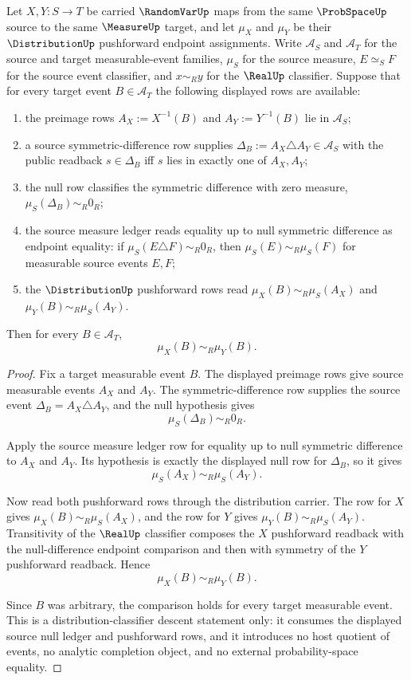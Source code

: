 \begin{theorem}
\label{thm:distribution-null-completion-random-variable-descent}
Let $X,Y:S\to T$ be carried $\RandomVarUp$ maps from the same
$\ProbSpaceUp$ source to the same $\MeasureUp$ target, and let $\mu_X$ and
$\mu_Y$ be their $\DistributionUp$ pushforward endpoint assignments. Write
$\mathcal A_S$ and $\mathcal A_T$ for the source and target measurable-event
families, $\mu_S$ for the source measure, $E\simeq_S F$ for the source event
classifier, and $x\sim_Ry$ for the $\RealUp$ classifier. Suppose that for
every target event $B\in\mathcal A_T$ the following displayed rows are
available:
\begin{enumerate}
\item the preimage rows $A_X:=X^{-1}(B)$ and $A_Y:=Y^{-1}(B)$ lie in
  $\mathcal A_S$;
\item a source symmetric-difference row supplies
  $\Delta_B:=A_X\triangle A_Y\in\mathcal A_S$ with the public readback
  $s\in\Delta_B$ iff $s$ lies in exactly one of $A_X,A_Y$;
\item the null row classifies the symmetric difference with zero measure,
  $\mu_S(\Delta_B)\sim_R0_R$;
\item the source measure ledger reads equality up to null symmetric
  difference as endpoint equality:
  if $\mu_S(E\triangle F)\sim_R0_R$, then $\mu_S(E)\sim_R\mu_S(F)$ for
  measurable source events $E,F$;
\item the $\DistributionUp$ pushforward rows read
  $\mu_X(B)\sim_R\mu_S(A_X)$ and
  $\mu_Y(B)\sim_R\mu_S(A_Y)$.
\end{enumerate}
Then for every $B\in\mathcal A_T$,
$$
\mu_X(B)\sim_R\mu_Y(B).
$$
\end{theorem}
\begin{proof}
Fix a target measurable event $B$. The displayed preimage rows give source
measurable events $A_X$ and $A_Y$. The symmetric-difference row supplies the
source event $\Delta_B=A_X\triangle A_Y$, and the null hypothesis gives
$$
\mu_S(\Delta_B)\sim_R0_R.
$$

Apply the source measure ledger row for equality up to null symmetric
difference to $A_X$ and $A_Y$. Its hypothesis is exactly the displayed null
row for $\Delta_B$, so it gives
$$
\mu_S(A_X)\sim_R\mu_S(A_Y).
$$

Now read both pushforward rows through the distribution carrier. The row for
$X$ gives $\mu_X(B)\sim_R\mu_S(A_X)$, and the row for $Y$ gives
$\mu_Y(B)\sim_R\mu_S(A_Y)$. Transitivity of the $\RealUp$ classifier composes
the $X$ pushforward readback with the null-difference endpoint comparison and
then with symmetry of the $Y$ pushforward readback. Hence
$$
\mu_X(B)\sim_R\mu_Y(B).
$$

Since $B$ was arbitrary, the comparison holds for every target measurable
event. This is a distribution-classifier descent statement only: it consumes
the displayed source null ledger and pushforward rows, and it introduces no
host quotient of events, no analytic completion object, and no external
probability-space equality.
\end{proof}

